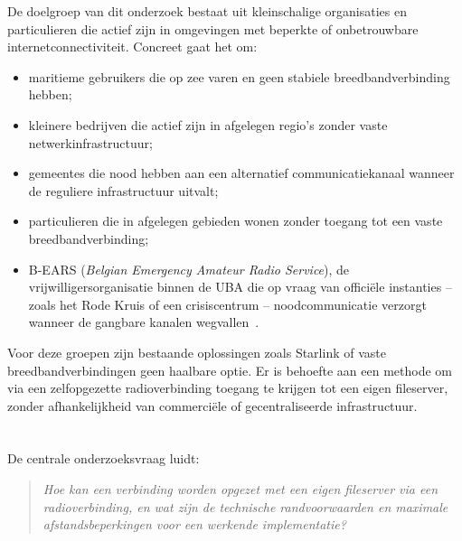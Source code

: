 De doelgroep van dit onderzoek bestaat uit kleinschalige organisaties en particulieren die actief
zijn in omgevingen met beperkte of onbetrouwbare internetconnectiviteit. Concreet gaat het om:

\begin{itemize}
  \item maritieme gebruikers die op zee varen en geen stabiele breedbandverbinding hebben;
  \item kleinere bedrijven die actief zijn in afgelegen regio's zonder vaste
        netwerkinfrastructuur;
  \item gemeentes die nood hebben aan een alternatief communicatiekanaal wanneer de reguliere
        infrastructuur uitvalt;
  \item particulieren die in afgelegen gebieden wonen zonder toegang tot een vaste
        breedbandverbinding;
  \item B-EARS (\textit{Belgian Emergency Amateur Radio Service}), de vrijwilligersorganisatie
        binnen de UBA die op vraag van officiële instanties -- zoals het Rode Kruis of een
        crisiscentrum -- noodcommunicatie verzorgt wanneer de gangbare kanalen
        wegvallen~\autocite{UBABEARS}.
\end{itemize}

Voor deze groepen zijn bestaande oplossingen zoals Starlink of vaste breedbandverbindingen
geen haalbare optie. Er is behoefte aan een methode om via een zelfopgezette radioverbinding
toegang te krijgen tot een eigen fileserver, zonder afhankelijkheid van commerciële of
gecentraliseerde infrastructuur.

\section{}%
\label{sec:onderzoeksvraag}


De centrale onderzoeksvraag luidt:

\begin{quote}
  \textit{Hoe kan een verbinding worden opgezet met een eigen fileserver via een
  radioverbinding, en wat zijn de technische randvoorwaarden en maximale
  afstandsbeperkingen voor een werkende implementatie?}
\end{quote}

